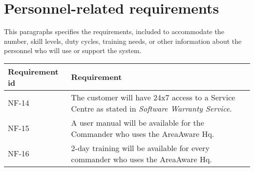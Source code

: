 \section{Personnel-related requirements}
This paragraphs specifies the requirements, included to accommodate the number, skill levels, duty cycles, training needs, or other information about the personnel who will use or support the system.


\begin{longtable}{| p{3.2cm} |  p{10cm} | }
	\hline
	\textbf{Requirement id} &  \textbf{Requirement } \\
	\hline
	NF-14 &The customer will have 24x7 access to a Service Centre as stated in \emph{Software Warranty Service}.  \\
	\hline
	NF-15 & A user manual will be available for the Commander who uses the AreaAware Hq. \\
	\hline
	NF-16 & 2-day training will be available for every commander who uses the AreaAware Hq. \\
	\hline
\end{longtable}



